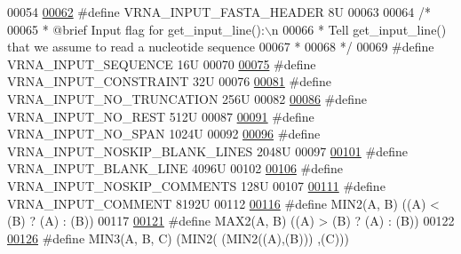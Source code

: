 \begin{DoxyCode}
00054 
\hypertarget{utils_8h_source.tex_l00062}{}\hyperlink{group__utils_ga2f0d8069e93d3ac54d9320d6bdb8e7e7}{00062} \textcolor{preprocessor}{#define VRNA\_INPUT\_FASTA\_HEADER           8U}
00063 
00064 \textcolor{comment}{/*}
00065 \textcolor{comment}{ *  @brief  Input flag for get\_input\_line():\(\backslash\)n}
00066 \textcolor{comment}{ *  Tell get\_input\_line() that we assume to read a nucleotide sequence}
00067 \textcolor{comment}{ * }
00068 \textcolor{comment}{ */}
00069 \textcolor{preprocessor}{#define VRNA\_INPUT\_SEQUENCE               16U}
00070 
\hypertarget{utils_8h_source.tex_l00075}{}\hyperlink{group__utils_gac08a9df45b9721b97a47dbfe7a6e5f85}{00075} \textcolor{preprocessor}{#define VRNA\_INPUT\_CONSTRAINT             32U}
00076 
\hypertarget{utils_8h_source.tex_l00081}{}\hyperlink{group__utils_ga086742158293217a46ae2f71bb296937}{00081} \textcolor{preprocessor}{#define VRNA\_INPUT\_NO\_TRUNCATION          256U}
00082 
\hypertarget{utils_8h_source.tex_l00086}{}\hyperlink{group__utils_ga7a2e8c50a0c7ce82e60da1016e1367fd}{00086} \textcolor{preprocessor}{#define VRNA\_INPUT\_NO\_REST                512U}
00087 
\hypertarget{utils_8h_source.tex_l00091}{}\hyperlink{group__utils_ga0de536599b881c787b0943a2671da476}{00091} \textcolor{preprocessor}{#define VRNA\_INPUT\_NO\_SPAN                1024U}
00092 
\hypertarget{utils_8h_source.tex_l00096}{}\hyperlink{group__utils_gab4db885222b3b69608310d7c7e63e286}{00096} \textcolor{preprocessor}{#define VRNA\_INPUT\_NOSKIP\_BLANK\_LINES     2048U}
00097 
\hypertarget{utils_8h_source.tex_l00101}{}\hyperlink{group__utils_ga305474b93ccb79ae4c7754016a8ddd84}{00101} \textcolor{preprocessor}{#define VRNA\_INPUT\_BLANK\_LINE             4096U}
00102 
\hypertarget{utils_8h_source.tex_l00106}{}\hyperlink{group__utils_ga0f6311f11bed1842e3a527ab27b294c6}{00106} \textcolor{preprocessor}{#define VRNA\_INPUT\_NOSKIP\_COMMENTS        128U}
00107 
\hypertarget{utils_8h_source.tex_l00111}{}\hyperlink{group__utils_gaf2062e0eeefffd3ed639af460b3d4fab}{00111} \textcolor{preprocessor}{#define VRNA\_INPUT\_COMMENT                8192U}
00112 
\hypertarget{utils_8h_source.tex_l00116}{}\hyperlink{group__utils_ga2dd4a927a7f937f43a90c144d79107d8}{00116} \textcolor{preprocessor}{#define MIN2(A, B)      ((A) < (B) ? (A) : (B))}
00117 
\hypertarget{utils_8h_source.tex_l00121}{}\hyperlink{group__utils_gadd91367918fadbc8d585940d6206d6d2}{00121} \textcolor{preprocessor}{#define MAX2(A, B)      ((A) > (B) ? (A) : (B))}
00122 
\hypertarget{utils_8h_source.tex_l00126}{}\hyperlink{group__utils_gafb23911b91805692382004ab5441f47c}{00126} \textcolor{preprocessor}{#define MIN3(A, B, C)   (MIN2(  (MIN2((A),(B))) ,(C)))}

\end{DoxyCode}
